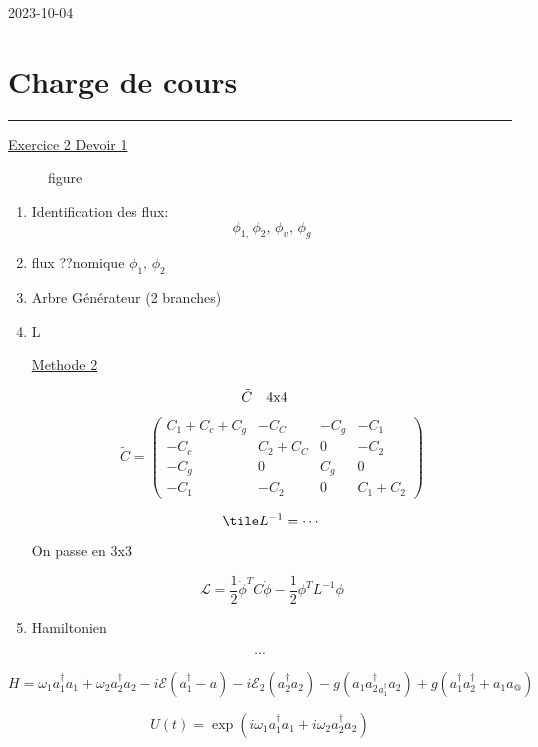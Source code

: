 


2023-10-04

\section*{Charge de cours}
\hrule

\underline{Exercice 2 Devoir 1}

\begin{figure}[ht]
    \centering
    \caption{figure}
    \label{fig:figure}
\end{figure}

\begin{enumerate}
\item Identification des flux:
	\[ \phi_{1,\,} \phi_2 ,\, \phi_v ,\, \phi_g \]


\item flux ??nomique $\phi_1 ,\, \phi_2 $

\item Arbre Générateur (2 branches)

\item L

\underline{Methode 2}

\[ \tilde C \qq{4x4} \]

\[ \tilde C = \begin{pmatrix} C_1 + C_c + C_g & -C_C & -C_g  & -C_1 \\ 
	-C_c & C_2 + C_C & 0 & -C_2 \\ -C_g & 0 & C_g &0 \\ -C_1 & -C_2 & 0 & C_1 + C_2
\end{pmatrix} \]

	\[ \tile L^{-1} = \dotsb\]

On passe en 3x3

\[ 	\mathscr{L} = \frac{1}{2} \dot \phi^{T} C \dot\phi - \frac{1}{2} \phi^{T} L^{-1} \phi \]

\item Hamiltonien


\end{enumerate}

\[ \dotsb \]


\[ H = \omega_1 a_1^{\dagger} a_1 +\omega_2 a_2^{\dagger}a_2 - i\mathcal{E} \left( a_1 ^{\dagger} -a  \right) -i \mathcal{E}_2 \left( a_2^{\dagger} a_2 \right) - g(a_1 a_2^{\dagger} _ a_1^{\dagger} a_2 ) +g \left( a_1^{\dagger} a_2^{\dagger} + a_1 a_@  \right) \]

\[ U(t) = \exp(i\omega_1 a_1^{\dagger}a_1 + i\omega_2a_2^{\dagger} a_2 ) \]

